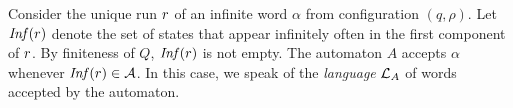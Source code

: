 \begin{definition}\label{def:acceptance-of-hdmas}
 Consider the unique run $r$ of an infinite word $\alpha$ from configuration $(q,\rho)$. 
 Let $\mathit{Inf}(r)$ denote the set  of states that appear infinitely often in the first component of $r$. By finiteness of $Q$, $\mathit{Inf}(r)$ is not empty. The automaton $A$ accepts $\alpha$ whenever $\mathit{Inf}(r) \in \mathcal{A}$. In this case, we speak of the \emph{language} $\mathcal{L}_A$ of words accepted by the automaton.
\end{definition}
%
%	
%
%
%	
%
%
%
%
%

